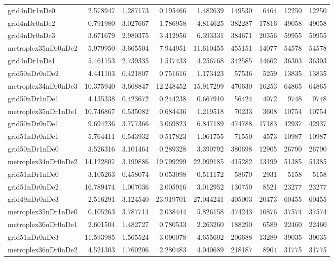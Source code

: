\documentclass[../../../thesis.tex]{subfiles}
\begin{document}
\begin{longtable}{|l|r|r|r|r|r|r|r|r|}
grid4nDr1nDe0 & 2.578947 & 1.287173 & 0.195466 & 1.482639 & 149530 & 6464 & 12250 & 12250 \\
grid4nDr0nDe2 & 0.791980 & 3.027667 & 1.786958 & 4.814625 & 382287 & 17816 & 49058 & 49058 \\
grid4nDr0nDe3 & 3.671679 & 2.980375 & 3.412956 & 6.393331 & 384671 & 20356 & 59955 & 59955 \\
metroplex35nDr0nDe2 & 5.979950 & 3.665504 & 7.944951 & 11.610455 & 455151 & 14077 & 54578 & 54578 \\
grid4nDr1nDe1 & 5.461153 & 2.739335 & 1.517433 & 4.256768 & 342585 & 14662 & 36303 & 36303 \\
grid50nDr0nDe2 & 4.441103 & 0.421807 & 0.751616 & 1.173423 & 57536 & 5259 & 13835 & 13835 \\
metroplex34nDr0nDe3 & 10.375940 & 3.668847 & 12.248452 & 15.917299 & 470630 & 16253 & 64865 & 64865 \\
grid50nDr1nDe1 & 4.135338 & 0.423672 & 0.244238 & 0.667910 & 56424 & 4072 & 9748 & 9748 \\
metroplex35nDr1nDe1 & 10.746867 & 0.535082 & 0.684436 & 1.219518 & 70233 & 3608 & 10754 & 10754 \\
grid50nDr0nDe1 & 9.694236 & 3.777366 & 3.069823 & 6.847189 & 474788 & 17183 & 42937 & 42937 \\
grid51nDr0nDe1 & 5.764411 & 0.543932 & 0.517823 & 1.061755 & 71550 & 4573 & 10987 & 10987 \\
grid50nDr1nDe0 & 3.526316 & 3.101464 & 0.289328 & 3.390792 & 380698 & 12905 & 26790 & 26790 \\
metroplex34nDr0nDe2 & 14.122807 & 3.199886 & 19.799299 & 22.999185 & 415282 & 13199 & 51385 & 51385 \\
grid51nDr1nDe0 & 3.105263 & 0.458074 & 0.053098 & 0.511172 & 58670 & 2931 & 5158 & 5158 \\
grid51nDr0nDe2 & 16.789474 & 1.007036 & 2.005916 & 3.012952 & 130750 & 8521 & 23277 & 23277 \\
grid49nDr0nDe3 & 2.516291 & 3.124540 & 23.919701 & 27.044241 & 405003 & 20473 & 60455 & 60455 \\
metroplex35nDr1nDe0 & 0.105263 & 3.787714 & 2.038444 & 5.826158 & 474243 & 10876 & 37574 & 37574 \\
metroplex36nDr0nDe1 & 2.601504 & 1.482727 & 0.780533 & 2.263260 & 188290 & 6589 & 22460 & 22460 \\
grid51nDr0nDe3 & 11.593985 & 1.565524 & 3.090078 & 4.655602 & 206688 & 13289 & 39035 & 39035 \\
metroplex36nDr0nDe2 & 4.521303 & 1.760206 & 2.280483 & 4.040689 & 218187 & 8904 & 31775 & 31775 \\

\end{longtable}
\end{document}
